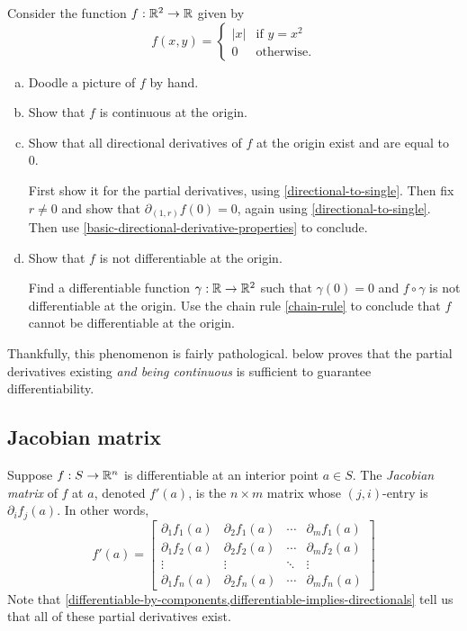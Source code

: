 \begin{exercise} \label{directionals-and-linear-dont-imply-differentiable}
	Consider the function $f : \mathbb{R}^2 \to \mathbb{R}$ given by
	\[ f(x,y) = \begin{cases} |x| & \text{if } y = x^2 \\ 0 & \text{otherwise}. \end{cases} \]
	\begin{enumerate}[(a)]
		\item Doodle a picture of $f$ by hand.
		\item Show that $f$ is continuous at the origin. 
		\item Show that all directional derivatives of $f$ at the origin exist and are equal to 0. 
		\begin{hint}
			First show it for the partial derivatives, using \cref{directional-to-single}. Then fix $r \neq 0$ and show that $\partial_{(1,r)}f(0) = 0$, again using \cref{directional-to-single}. Then use \cref{basic-directional-derivative-properties} to conclude. 
		\end{hint}
		\item Show that $f$ is not differentiable at the origin.
		\begin{hint}
			Find a differentiable function $\gamma : \mathbb{R} \to \mathbb{R}^2$ such that $\gamma(0) = 0$ and $f \circ \gamma$ is not differentiable at the origin. Use the chain rule \ref{chain-rule} to conclude that $f$ cannot be differentiable at the origin. 
		\end{hint}
	\end{enumerate} 
\end{exercise}

Thankfully, this phenomenon is fairly pathological.  below proves that the partial derivatives existing \emph{and being continuous} is sufficient to guarantee differentiability. 

\subsection{Jacobian matrix}

\begin{definition}  
	Suppose $f : S \to \mathbb{R}^n$ is differentiable at an interior point $a \in S$. The \emph{Jacobian matrix} of $f$ at $a$, denoted $f'(a)$, is the $n \times m$ matrix whose $(j, i)$-entry is $\partial_i f_j(a)$. In other words,
	\[ f'(a) = \begin{bmatrix} \partial_1 f_1(a) & \partial_2 f_1(a) & \dotsb & \partial_m f_1(a) \\ 
	\partial_1 f_2(a) & \partial_2 f_2(a) & \dotsb & \partial_m f_2(a) \\
	\vdots & \vdots & \ddots & \vdots \\ 
	\partial_1 f_n(a) & \partial_2 f_n(a) & \dotsb & \partial_m f_n(a) \end{bmatrix} \]
	Note that \cref{differentiable-by-components,differentiable-implies-directionals} tell us that all of these partial derivatives exist. 
\end{definition}

